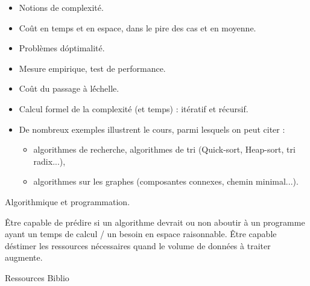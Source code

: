 {
\begin{itemize} 
\item Notions de complexité.
\item Coût en temps et en espace, dans le pire des cas et en moyenne.
\item Problèmes d\'optimalité.
\item Mesure empirique, test de performance.
\item Coût du passage à l\'échelle.
\item Calcul formel de la complexité (et temps) : itératif et récursif.
\item De nombreux exemples illustrent le cours, parmi lesquels on peut citer :
  \begin{itemize} 
  \item algorithmes de recherche, algorithmes de tri (Quick-sort, Heap-sort, tri radix...),
  \item algorithmes sur les graphes (composantes connexes, chemin minimal...).
  \end{itemize} 
\end{itemize} 
} 
{Algorithmique et programmation.} 
{\begin{itemize} 
  \ObjItem Être capable de prédire si un algorithme devrait ou non aboutir à un
programme ayant un temps de calcul / un besoin en espace raisonnable.
  \ObjItem Être capable d\'estimer les ressources nécessaires quand le volume de
données à traiter augmente.
\end{itemize} 
} 
{Ressources} 
{Biblio} 
 
\vfill

